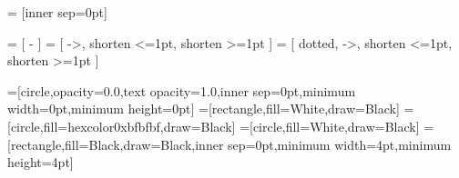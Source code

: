 \usepackage{tikz}



\tikzset{>=latex}
   = [inner sep=0pt]

  = [ - ]
  = [ ->, shorten <=1pt, shorten >=1pt ]
 = [ dotted, ->, shorten <=1pt, shorten >=1pt ]

=[circle,opacity=0.0,text opacity=1.0,inner sep=0pt,minimum
width=0pt,minimum height=0pt]
=[rectangle,fill=White,draw=Black]
=[circle,fill=hexcolor0xbfbfbf,draw=Black]
=[circle,fill=White,draw=Black]
=[rectangle,fill=Black,draw=Black,inner sep=0pt,minimum width=4pt,minimum height=4pt]
